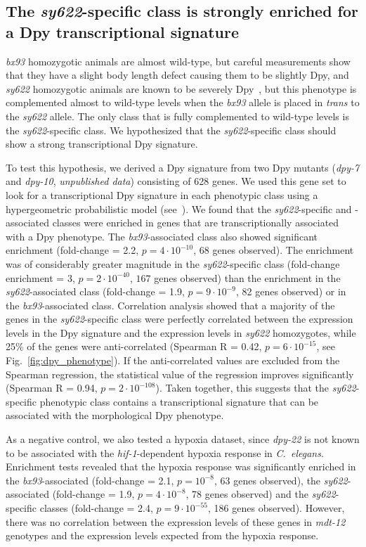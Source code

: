 \documentclass[10pt, twocolumn]{article}
\newcommand{\cel}{\emph{C.~elegans}}
\newcommand{\gene}[1]{\mbox{\emph{#1}}}
\newcommand{\dpy}{\gene{mdt-12}}
\begin{document}
\subsection*{The \emph{sy622}-specific class is strongly enriched for a Dpy
             transcriptional signature}
\emph{bx93} homozygotic animals are almost wild-type, but careful measurements
show that they have a slight body length defect causing them to be slightly Dpy,
and \emph{sy622} homozygotic animals are known to be severely
Dpy~\cite{Moghal2003}, but this phenotype is complemented almost to wild-type
levels when the \emph{bx93} allele is placed in \emph{trans} to the \emph{sy622}
allele. The only class that is fully complemented to wild-type levels is the
\emph{sy622}-specific class. We hypothesized that the
\emph{sy622}-specific class should show a strong transcriptional Dpy signature.

To test this hypothesis, we derived a Dpy signature from two Dpy mutants
(\gene{dpy-7} and \gene{dpy-10}, \emph{unpublished data}) consisting of 628
genes. We used this gene set to look for a transcriptional Dpy signature in each
phenotypic class using a hypergeometric probabilistic model
(see~). We found that the \emph{sy622}-specific and
-associated classes were enriched in genes that are transcriptionally associated
with a Dpy phenotype. The \emph{bx93}-associated class also showed significant
enrichment (fold-change = 2.2, $p=4\cdot10^{-10}$, 68 genes observed). The
enrichment was of considerably greater magnitude in the \emph{sy622}-specific
class (fold-change enrichment = 3, $p=2\cdot 10^{-40}$, $167$ genes observed)
than the enrichment in the \emph{sy622}-associated class (fold-change = 1.9,
$p=9\cdot10^{-9}$, 82 genes observed) or in the \emph{bx93}-associated class.
Correlation analysis showed that a majority of the genes in the
\emph{sy622}-specific class were perfectly correlated between the expression
levels in the Dpy signature and the expression levels in \emph{sy622}
homozygotes, while 25\% of the genes were anti-correlated (Spearman R = 0.42,
$p=6\cdot10^{-15}$, see Fig.~\ref{fig:dpy_phenotype}). If the anti-correlated
values are excluded from the Spearman regression, the statistical value of the
regression improves significantly (Spearman R = 0.94, $p=2\cdot10^{-108}$).
Taken together, this suggests that the \emph{sy622}-specific phenotypic class
contains a transcriptional signature that can be associated with the
morphological Dpy phenotype.

As a negative control, we also tested a hypoxia dataset, since \emph{dpy-22} is
not known to be associated with the \gene{hif-1}-dependent hypoxia response in
\cel{}. Enrichment tests revealed that the hypoxia response was significantly
enriched in the \emph{bx93}-associated (fold-change = 2.1, $p=10^{-8}$, 63 genes
observed), the \emph{sy622}-associated (fold-change = 1.9, $p=4\cdot10^{-8}$, 78
genes observed) and the \emph{sy622}-specific classes (fold-change = 2.4,
$p=9\cdot10^{-55}$, 186 genes observed). However, there was no correlation
between the expression levels of these genes in \dpy{} genotypes and the
expression levels expected from the hypoxia response.
\end{document}
